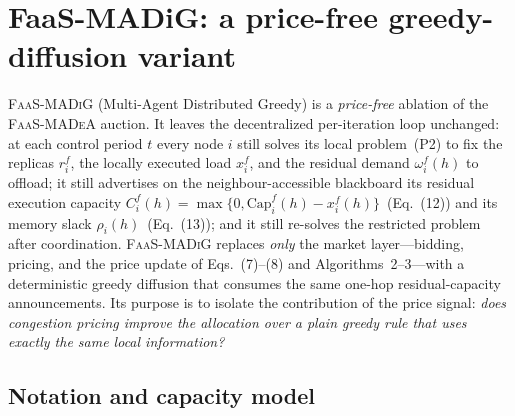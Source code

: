 
\section{FaaS-MADiG: a price-free greedy-diffusion variant}
\label{sec:madig}

\textsc{FaaS-MADiG} (Multi-Agent Distributed Greedy) is a \emph{price-free}
ablation of the \textsc{FaaS-MADeA} auction. It leaves the decentralized
per-iteration loop unchanged: at each control period $t$ every node $i$ still
solves its local problem~(P2) to fix the replicas $r_i^f$, the locally executed
load $x_i^f$, and the residual demand $\omega_i^f(h)$ to offload; it still
advertises on the neighbour-accessible blackboard its residual execution
capacity $C_i^f(h)=\max\{0,\mathrm{Cap}_i^f(h)-x_i^f(h)\}$~(Eq.~(12)) and its
memory slack $\rho_i(h)$~(Eq.~(13)); and it still re-solves the restricted
problem after coordination. \textsc{FaaS-MADiG} replaces \emph{only} the market
layer---bidding, pricing, and the price update of Eqs.~(7)--(8) and
Algorithms~2--3---with a deterministic greedy diffusion that consumes the same
one-hop residual-capacity announcements. Its purpose is to isolate the
contribution of the price signal: \emph{does congestion pricing improve the
allocation over a plain greedy rule that uses exactly the same local
information?}

\subsection{Notation and capacity model}
\label{sec:madig-notation}


